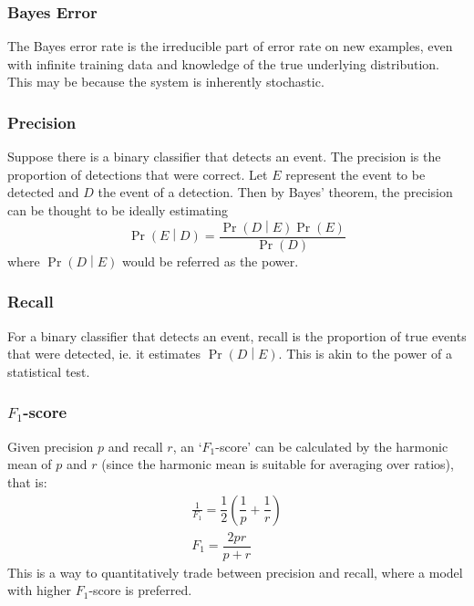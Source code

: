 \documentclass[11pt]{report} %
\begin{document}
\subsubsection{Bayes Error}

The Bayes error rate is the irreducible part of error rate on new examples, even with infinite training data and knowledge of the true underlying distribution. This may be because the system is inherently stochastic.

\subsubsection{Precision}

Suppose there is a binary classifier that detects an event. The precision is the proportion of detections that were correct. Let $E$ represent the event to be detected and $D$ the event of a detection. Then by Bayes' theorem, the precision can be thought to be ideally estimating
\begin{equation}
\operatorname{Pr}\left(E\middle|D\right) = \dfrac{\operatorname{Pr}\left(D\middle|E\right)\operatorname{Pr}\left(E\right)}{\operatorname{Pr}\left(D\right)}
\end{equation}
where $\operatorname{Pr}\left(D\middle|E\right)$ would be referred as the power.

\subsubsection{Recall}

For a binary classifier that detects an event, recall is the proportion of true events that were detected, ie. it estimates $\operatorname{Pr}\left(D\middle|E\right)$. This is akin to the power of a statistical test.

\subsubsection{$F_{1}$-score}

Given precision $p$ and recall $r$, an `$F_{1}$-score' can be calculated by the harmonic mean of $p$ and $r$ (since the harmonic mean is suitable for averaging over ratios), that is:
\begin{gather}
\frac{1}{F_{1}} = \dfrac{1}{2}\left(\dfrac{1}{p} + \dfrac{1}{r}\right) \\
F_{1} = \dfrac{2pr}{p + r}
\end{gather}
This is a way to quantitatively trade between precision and recall, where a model with higher $F_{1}$-score is preferred.
\end{document}
